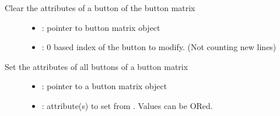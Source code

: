 \documentclass[letterpaper,10pt,english]{sphinxmanual}
\begin{document}

\begin{fulllineitems}
\label{\detokenize{object-types/btnm:_CPPv422lv_btnm_clear_btn_ctrlPK8lv_obj_t8uint16_t14lv_btnm_ctrl_t}}%
\pysigstartmultiline
{}\label{\detokenize{object-types/btnm:lv__btnm_8h_1a02d0a210cf0565d103725b204407ef94}}%
\pysigstopmultiline
Clear the attributes of a button of the button matrix \begin{description}
\item[{}] \leavevmode\begin{itemize}
\item {} 
: pointer to button matrix object 

\item {} 
: 0 based index of the button to modify. (Not counting new lines) 

\end{itemize}

\end{description}


\end{fulllineitems}


\begin{fulllineitems}
\label{\detokenize{object-types/btnm:_CPPv424lv_btnm_set_btn_ctrl_allP8lv_obj_t14lv_btnm_ctrl_t}}%
\pysigstartmultiline
{}\label{\detokenize{object-types/btnm:lv__btnm_8h_1a253ab5e364ff7b9e2c2e6523a21c231f}}%
\pysigstopmultiline
Set the attributes of all buttons of a button matrix \begin{description}
\item[{}] \leavevmode\begin{itemize}
\item {} 
: pointer to a button matrix object 

\item {} 
: attribute(s) to set from . Values can be ORed. 

\end{itemize}

\end{description}


\end{fulllineitems}
\end{document}
